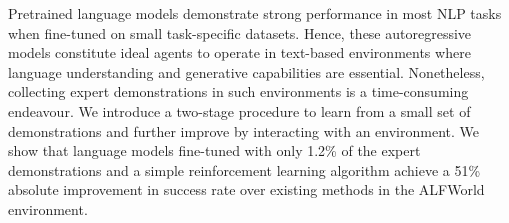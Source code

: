 Pretrained language models demonstrate strong performance in most NLP tasks when fine-tuned on small task-specific datasets. Hence, these autoregressive models constitute ideal agents to operate in text-based environments where language understanding and generative capabilities are essential. Nonetheless, collecting expert demonstrations in such environments is a time-consuming endeavour. We introduce a two-stage procedure to learn from a small set of demonstrations and further improve by interacting with an environment. We show that language models fine-tuned with only 1.2\% of the expert demonstrations and a simple reinforcement learning algorithm achieve a 51\% absolute improvement in success rate over existing methods in the ALFWorld environment.
